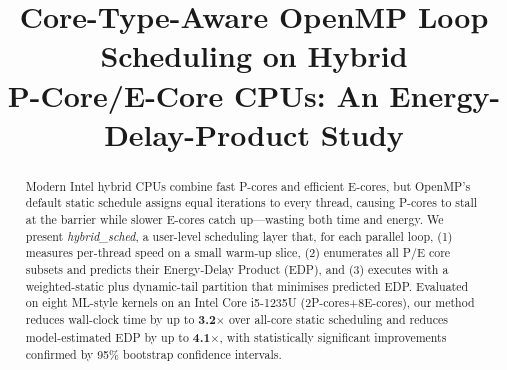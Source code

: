 \documentclass[conference]{IEEEtran}
\begin{document}
\title{Core-Type-Aware OpenMP Loop Scheduling on Hybrid\\
P-Core/E-Core CPUs: An Energy-Delay-Product Study}

\author{
\and
{}
\and
{}
}

\maketitle

\begin{abstract}
Modern Intel hybrid CPUs combine fast P-cores and efficient E-cores,
but OpenMP's default static schedule assigns equal iterations to every
thread, causing P-cores to stall at the barrier while slower E-cores
catch up---wasting both time and energy.
We present \textit{hybrid\_sched}, a user-level scheduling layer that,
for each parallel loop, (1) measures per-thread speed on a small warm-up
slice, (2) enumerates all P/E core subsets and predicts their
Energy-Delay Product (EDP), and (3) executes with a weighted-static
plus dynamic-tail partition that minimises predicted EDP.
Evaluated on eight ML-style kernels on an Intel Core i5-1235U
(2P-cores+8E-cores), our method reduces wall-clock time by up to
\textbf{3.2$\times$} over all-core static scheduling and reduces
model-estimated EDP by up to \textbf{4.1$\times$}, with statistically
significant improvements confirmed by 95\% bootstrap confidence intervals.
\end{abstract}
\end{document}

